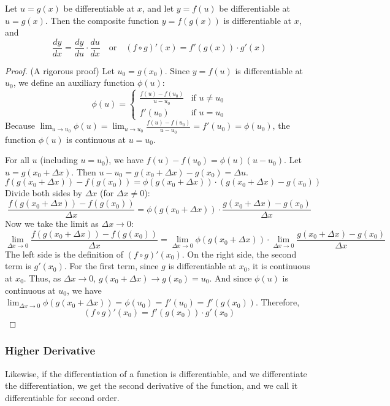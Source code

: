 \documentclass[oneside]{book}
\begin{document}
\begin{theorem}
Let $u = g(x)$ be differentiable at $x$, and let $y = f(u)$ be differentiable at $u = g(x)$.
Then the composite function $y = f(g(x))$ is differentiable at $x$, and
\[
\frac{dy}{dx} = \frac{dy}{du} \cdot \frac{du}{dx} \quad \text{or} \quad (f \circ g)'(x) = f'(g(x)) \cdot g'(x)
\]
\end{theorem}

\begin{proof}
(A rigorous proof)
Let $u_0 = g(x_0)$. Since $y=f(u)$ is differentiable at $u_0$, we define an auxiliary function $\phi(u)$:
\[
\phi(u) = \begin{cases}
    \frac{f(u) - f(u_0)}{u - u_0} & \text{if } u \neq u_0 \\
    f'(u_0) & \text{if } u = u_0
\end{cases}
\]
Because $\lim_{u \to u_0} \phi(u) = \lim_{u \to u_0} \frac{f(u) - f(u_0)}{u - u_0} = f'(u_0) = \phi(u_0)$, the function $\phi(u)$ is continuous at $u=u_0$.

For all $u$ (including $u=u_0$), we have $f(u) - f(u_0) = \phi(u)(u - u_0)$.
Let $u = g(x_0 + \Delta x)$. Then $u - u_0 = g(x_0 + \Delta x) - g(x_0) = \Delta u$.
\[
f(g(x_0 + \Delta x)) - f(g(x_0)) = \phi(g(x_0 + \Delta x)) \cdot (g(x_0 + \Delta x) - g(x_0))
\]
Divide both sides by $\Delta x$ (for $\Delta x \neq 0$):
\[
\frac{f(g(x_0 + \Delta x)) - f(g(x_0))}{\Delta x} = \phi(g(x_0 + \Delta x)) \cdot \frac{g(x_0 + \Delta x) - g(x_0)}{\Delta x}
\]
Now we take the limit as $\Delta x \to 0$:
\[
\lim_{\Delta x \to 0} \frac{f(g(x_0 + \Delta x)) - f(g(x_0))}{\Delta x} = \lim_{\Delta x \to 0} \phi(g(x_0 + \Delta x)) \cdot \lim_{\Delta x \to 0} \frac{g(x_0 + \Delta x) - g(x_0)}{\Delta x}
\]
The left side is the definition of $(f \circ g)'(x_0)$.
On the right side, the second term is $g'(x_0)$.
For the first term, since $g$ is differentiable at $x_0$, it is continuous at $x_0$. Thus, as $\Delta x \to 0$, $g(x_0 + \Delta x) \to g(x_0) = u_0$.
And since $\phi(u)$ is continuous at $u_0$, we have $\lim_{\Delta x \to 0} \phi(g(x_0 + \Delta x)) = \phi(u_0) = f'(u_0) = f'(g(x_0))$.
Therefore,
\[
(f \circ g)'(x_0) = f'(g(x_0)) \cdot g'(x_0)
\]
\end{proof}


\subsubsection{Higher Derivative}

\begin{definition}
Likewise, if the differentiation of a function is differentiable, and we differentiate the differentiation, we get the second derivative of the function, and we call it differentiable for second order.
\end{definition}
\end{document}
